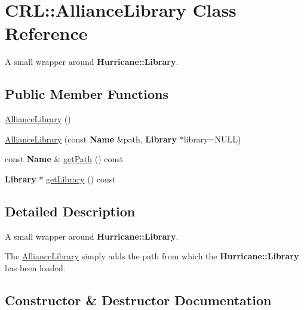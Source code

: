 \hypertarget{classCRL_1_1AllianceLibrary}{}\section{C\+RL\+:\+:Alliance\+Library Class Reference}
\label{classCRL_1_1AllianceLibrary}


A small wrapper around \textbf{ Hurricane\+::\+Library}.  


\subsection*{Public Member Functions}
\begin{DoxyCompactItemize}
\item 
\hyperlink{classCRL_1_1AllianceLibrary_ad7394ba603e21e655d4518795650f042}{Alliance\+Library} ()
\item 
\hyperlink{classCRL_1_1AllianceLibrary_a1a0c9a0f2b74eaae859206e5338107a0}{Alliance\+Library} (const \textbf{ Name} \&path, \textbf{ Library} $\ast$library=N\+U\+LL)
\item 
const \textbf{ Name} \& \hyperlink{classCRL_1_1AllianceLibrary_a3be21e668a6a01085df037989eacf6f8}{get\+Path} () const
\item 
\textbf{ Library} $\ast$ \hyperlink{classCRL_1_1AllianceLibrary_abd54e8a070660030c6d2af8a239359b5}{get\+Library} () const
\end{DoxyCompactItemize}


\subsection{Detailed Description}
A small wrapper around \textbf{ Hurricane\+::\+Library}. 

The \hyperlink{classCRL_1_1AllianceLibrary}{Alliance\+Library} simply adds the path from which the \textbf{ Hurricane\+::\+Library} has been loaded. 

\subsection{Constructor \& Destructor Documentation}
\mbox{\label{classCRL_1_1AllianceLibrary_ad7394ba603e21e655d4518795650f042}} 
